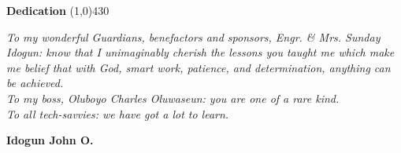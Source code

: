 \clearpage
\begin{center}
{\huge \bf Dedication}
\line(1,0){430}
\end{center}

\textit{To my wonderful Guardians, benefactors and sponsors, Engr. \& Mrs. Sunday Idogun: know that I unimaginably cherish the lessons you taught me which make me belief that with God, smart work, patience, and determination, anything can be achieved.}\\

\textit{To my boss, Oluboyo Charles Oluwaseun: you are one of a rare kind.}\\


\textit{To all tech-savvies: we have got a lot to learn.}
\begin{flushright}
	{\bf Idogun John O.}
\end{flushright}
  
\clearpage